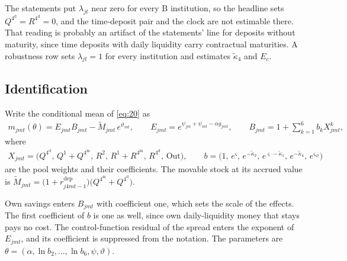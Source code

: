 The statements put $\lambda_{jt}$ near zero for every $\mathrm{B}$ institution, so the headline sets $Q^{4^{\mathrm{d}}}=R^{4^{\mathrm{d}}}=0$, and the time-deposit pair and the clock are not estimable there. That reading is probably an artifact of the statements' line for deposits without maturity, since time deposits with daily liquidity carry contractual maturities. A robustness row sets $\lambda_{jt}=1$ for every institution and estimates $\tilde{\kappa}_4$ and $E_c$.

\subsection{Identification}\label{app:netflow:ident}

Write the conditional mean of \eqref{eq:20} as
\begin{gather}
	m_{jmt}(\theta)=E_{jmt}B_{jmt}-\tilde{M}_{jmt}\,e^{\vartheta_{mt}},\qquad E_{jmt}=e^{\psi_{jm}+\psi_{mt}-\alpha g_{jmt}},\qquad B_{jmt}=1+\sum_{k=1}^{6}b_{k}X^{k}_{jmt}, \label{eq:app_mean}
\end{gather}
where
\begin{gather*}
	X_{jmt}=\bigl(Q^{4^{\mathrm{d}}},\,Q^{1}+Q^{4^{\mathrm{m}}},\,R^{2},\,R^{1}+R^{4^{\mathrm{m}}},\,R^{4^{\mathrm{d}}},\,\mathrm{Out}\bigr),\qquad b=\bigl(1,\,e^{\varsigma},\,e^{-\tilde{\kappa}_2},\,e^{\varsigma-\tilde{\kappa}_1},\,e^{-\tilde{\kappa}_4},\,e^{\varsigma_{\varnothing}}\bigr)
\end{gather*}
are the pool weights and their coefficients. The movable stock at its accrued value is $\tilde{M}_{jmt}=\bigl(1+r^{\mathrm{dep}}_{j4mt-1}\bigr)\bigl(Q^{4^{\mathrm{m}}}+Q^{4^{\mathrm{d}}}\bigr)$.

Own savings enters $B_{jmt}$ with coefficient one, which sets the scale of the effects. The first coefficient of $b$ is one as well, since own daily-liquidity money that stays pays no cost. The control-function residual of the spread enters the exponent of $E_{jmt}$, and its coefficient is suppressed from the notation. The parameters are $\theta=(\alpha,\ln b_2,\dots,\ln b_6,\psi,\vartheta)$.

